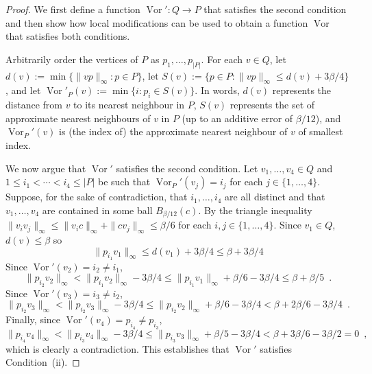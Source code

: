\documentclass{patmorin}
\DeclareMathOperator{\vor}{Vor}
\begin{document}
\begin{proof}
  We first define a function $\vor':Q\to P$ that satisfies the second condition and then show how local modifications can be used to obtain a function $\vor$ that satisfies both conditions.

  Arbitrarily order the vertices of $P$ as $p_1,\ldots,p_{|P|}$.  For each $v\in Q$, let $d(v):=\min\{\|vp\|_\infty:p\in P\}$, let $S(v):=\{p\in P:\|vp\|_\infty \le d(v)+3\beta/4\}$, and let $\vor'_P(v):=\min\{i:p_i\in S(v)\}$.  In words, $d(v)$ represents the distance from $v$ to its nearest neighbour in $P$, $S(v)$ represents the set of approximate nearest neighbours of $v$ in $P$ (up to an additive error of $\beta/12$), and $\vor_P'(v)$ is (the index of) the approximate nearest neighbour of $v$ of smallest index.

  We now argue that $\vor'$ satisfies the second condition.  Let $v_1,\ldots,v_4\in Q$ and $1\le i_1<\cdots<i_4\le|P|$ be such that $\vor_P'(v_j)=i_j$ for each $j\in\{1,\ldots,4\}$.  Suppose, for the sake of contradiction, that $i_1,\ldots,i_4$ are all distinct and that $v_1,\ldots,v_4$ are contained in some ball $B_{\beta/12}(c)$.  By the triangle inequality $\|v_iv_j\|_\infty \le \|v_ic\|_\infty+\|cv_j\|_\infty \le \beta/6$ for each  $i,j\in\{1,\ldots,4\}$.
  Since $v_1\in Q$, $d(v)\le\beta$ so
  \[ \|p_{i_1}v_1\|_\infty \le d(v_1) + 3\beta/4 \le \beta + 3\beta/4 \]
  Since $\vor'(v_2)=i_2\neq i_1$,
  \[ \|p_{i_2}v_2\|_\infty
     < \|p_{i_1}v_2\|_\infty - 3\beta/4
     \le \|p_{i_1}v_1\|_\infty + \beta/6 - 3\beta/4
     \le \beta + \beta/5 \enspace .
  \]
  Since $\vor'(v_3)=i_3\neq i_2$,
  \[
     \|p_{i_2}v_3\|_\infty
     < \|p_{i_2}v_3\|_\infty - 3\beta/4
     \le \|p_{i_2}v_2\|_\infty + \beta/6 - 3\beta/4
     < \beta + 2\beta/6 - 3\beta/4 \enspace .
  \]
  Finally, since $\vor'(v_4)=p_{i_4}\neq p_{i_3}$,
  \[
    \|p_{i_4}v_4\|_\infty
    < \|p_{i_3}v_4\|_\infty - 3\beta/4
    \le \|p_{i_3}v_3\|_\infty + \beta/5 - 3\beta/4
    < \beta + 3\beta/6 - 3\beta/2 = 0 \enspace ,
  \]
  which is clearly a contradiction.  This establishes that $\vor'$ satisfies Condition~(ii).
\end{proof}
\end{document}
